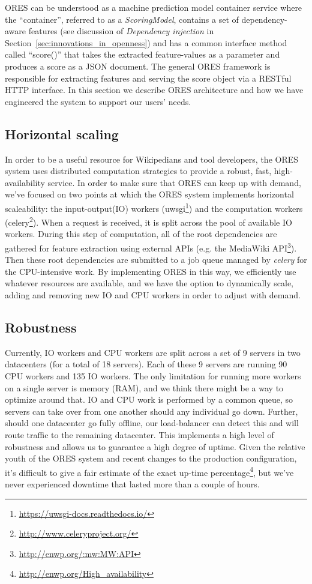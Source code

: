 
ORES can be understood as a machine prediction model container service where the ``container'', referred to as a \emph{ScoringModel}, contains a set of dependency-aware features (see discussion of \emph{Dependency injection} in Section~\ref{sec:innovations_in_openness}) and has a common interface method called ``score()'' that takes the extracted feature-values as a parameter and produces a score as a JSON document.  The general ORES framework is responsible for extracting features and serving the score object via a RESTful HTTP interface.  In this section we describe ORES architecture and how we have engineered the system to support our users' needs.

\subsection{Horizontal scaling}
In order to be a useful resource for Wikipedians and tool developers, the ORES system uses distributed computation strategies to provide a robust, fast, high-availability service.   In order to make sure that ORES can keep up with demand, we've focused on two points at which the ORES system implements horizontal scaleability: the input-output(IO) workers (uwsgi\footnote{\url{https://uwsgi-docs.readthedocs.io/}}) and the computation workers (celery\footnote{\url{http://www.celeryproject.org/}}).  When a request is received, it is split across the pool of available IO workers.  During this step of computation, all of the root dependencies are gathered for feature extraction using external APIs (e.g. the MediaWiki API\footnote{\url{http://enwp.org/:mw:MW:API}}).  Then these root dependencies are submitted to a job queue managed by \emph{celery} for the CPU-intensive work.  By implementing ORES in this way, we efficiently use whatever resources are available, and we have the option to dynamically scale, adding and removing new IO and CPU workers in order to adjust with demand.

\subsection{Robustness}
Currently, IO workers and CPU workers are split across a set of 9 servers in two datacenters (for a total of 18 servers).  Each of these 9 servers are running 90 CPU workers and 135 IO workers.  The only limitation for running more workers on a single server is memory (RAM), and we think there might be a way to optimize around that.  IO and CPU work is performed by a common queue, so servers can take over from one another should any individual go down.  Further, should one datacenter go fully offline, our load-balancer can detect this and will route traffic to the remaining datacenter.  This implements a high level of robustness and allows us to guarantee a high degree of uptime.  Given the relative youth of the ORES system and recent changes to the production configuration, it's difficult to give a fair estimate of the exact up-time percentage\footnote{\url{http://enwp.org/High_availability}}, but we've never experienced downtime that lasted more than a couple of hours.

